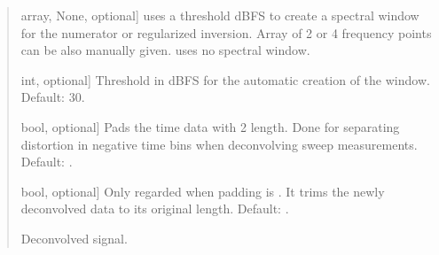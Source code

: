 \documentclass[letterpaper,10pt,english]{sphinxmanual}
\begin{document}
\begin{fulllineitems}
\begin{quote}
\begin{description}
\begin{description}
\sphinxlineitem{\sphinxstylestrong{start\_stop\_hz}}{[}array, None, optional{]}
\sphinxAtStartPar
{} uses a threshold dBFS to create a spectral
window for the numerator or regularized inversion. Array of 2 or
4 frequency points can be also manually given.  uses no
spectral window.

\sphinxlineitem{\sphinxstylestrong{threshold}}{[}int, optional{]}
\sphinxAtStartPar
Threshold in dBFS for the automatic creation of the window.
Default: \sphinxhyphen{}30.

\sphinxlineitem{\sphinxstylestrong{padding}}{[}bool, optional{]}
\sphinxAtStartPar
Pads the time data with 2 length. Done for separating distortion
in negative time bins when deconvolving sweep measurements.
Default: .

\sphinxlineitem{\sphinxstylestrong{keep\_original\_length}}{[}bool, optional{]}
\sphinxAtStartPar
Only regarded when padding is . It trims the newly deconvolved
data to its original length. Default: .

\end{description}

\begin{description}
\sphinxlineitem{\sphinxstylestrong{new\_sig}}{[}\sphinxtitleref{Signal}{]}
\sphinxAtStartPar
Deconvolved signal.

\end{description}

\end{description}\end{quote}

\end{fulllineitems}

\end{document}
